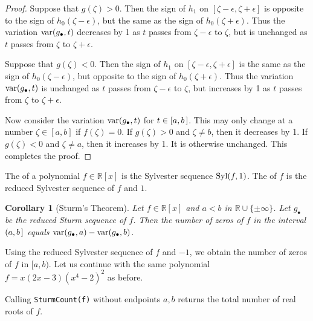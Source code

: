 \documentclass[12pt]{amsart}
\newtheorem{corollary}[theorem]{Corollary}
\theoremstyle{definition}
\newcommand{\RR}{\mathbb{R}}
\DeclareMathOperator{\var}{{\rm var}}
\DeclareMathOperator{\Syl}{{\rm Syl}}
\newcommand{\defcolor}[1]{{\color{TAMU}#1}}
\newcommand{\demph}[1]{\defcolor{{\sl #1}}}
\begin{document}
\begin{proof}
 Suppose that $g(\zeta)>0$.
 Then the sign of $h_1$ on $[\zeta-\epsilon,\zeta+\epsilon]$ is opposite to the sign of $h_0(\zeta-\epsilon)$, but the same as the sign of
 $h_0(\zeta+\epsilon)$.
 Thus the variation $\var(g_\bullet,t)$ decreases by 1 as $t$ passes from $\zeta-\epsilon$ to $\zeta$, but is unchanged as $t$
 passes from $\zeta$ to $\zeta+\epsilon$.
  

 Suppose that $g(\zeta)<0$.
 Then the sign of $h_1$ on $[\zeta-\epsilon,\zeta+\epsilon]$ is the same as the sign of $h_0(\zeta-\epsilon)$, but opposite to the sign of
 $h_0(\zeta+\epsilon)$.
 Thus the variation $\var(g_\bullet,t)$ is unchanged as $t$ passes from $\zeta-\epsilon$ to $\zeta$, but increases by 1 as $t$ 
 passes from $\zeta$ to $\zeta+\epsilon$.

 Now consider the variation $\var(g_\bullet,t)$ for $t\in[a,b\hspace{.05cm}]$.
 This may only change at a number $\zeta\in[a,b]$ if $f(\zeta)=0$.
 If $g(\zeta)>0$ and $\zeta\neq b$, then it decreases by 1.
 If $g(\zeta)<0$ and $\zeta\neq a$, then it increases by 1.
 It is otherwise unchanged.
 This completes the proof.
 \end{proof}

The \demph{Sturm sequence} of a polynomial $f\in\RR[x]$ is the Sylvester sequence $\Syl(f,1)$.
The \demph{reduced Sturm sequence} of $f$ is the reduced Sylvester sequence of $f$ and $1$.

\begin{corollary}[Sturm's Theorem]
  Let $f\in\RR[x]$ and $a<b$ in $\mathbb{R}\cup\{\pm\infty\}$.
  Let $g_\bullet$ be the reduced Sturm sequence of $f$.
  Then the number of zeros of $f$ in the interval $(a,b\hspace{.05cm}]$ equals  $\var(g_\bullet,a) - \var(g_\bullet,b)$.
\end{corollary}

Using the reduced Sylvester sequence of $f$ and $-1$, we obtain the number of zeros of $f$ in $[a,b)$. Let us continue with the same polynomial $f=x(2x-3)(x^4-2)^2$ as before.
%
\begin{leftbar}

\end{leftbar}
%
\noindent Calling {\tt SturmCount(f)} without endpoints $a,b$ returns the total number of real roots of $f$.
\end{document}

